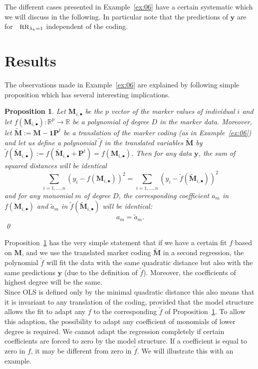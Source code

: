 \documentclass{bmcart}
\newtheorem{proposition}{Proposition}
\newcommand{\M}{\mathbf{M}}
\newcommand{\0}{\mathbf{0}}
\newcommand{\y}{\mathbf{y}}
\renewcommand{\P}{\mathbf{P}}
\begin{document}
The different cases presented in Example~\ref{ex:06} have a certain systematic which we will discuss in the following. 
In particular note that the predictions of $\y$ are for $\mbox{\small RR}_{\lambda_h = 1}$ independent of the coding.


\section*{Results} 
The observations made in Example~\ref{ex:06} are explained by following simple proposition
which has several interesting implications.
\begin{proposition}\label{prop:01} Let $\M_{i,\bullet}$ be the $p$ vector of the marker values of individual $i$ and let $f(\M_{i,\bullet}): \mathbb{R}^p \rightarrow \mathbb{R}$ be a polynomial of degree $D$ in the marker data. Moreover, let $\tilde{\M}:= \M - \mathbf{1} \P^t$ be a translation of the marker coding (as in Example~\ref{ex:06}) and let us define a polynomial $\tilde{f}$ in the translated variables $\tilde{\M}$ by $\tilde{f}(\tilde{\M}_{i,\bullet}):= f(\tilde{\M}_{i,\bullet} +  \P^t)=f(\M_{i,\bullet})$. Then for any data $\y$, the sum of squared distances will be identical 
	$$ \sum_{i=1,...,n} (y_i - f(\M_{i,\bullet}))^2 = \sum_{i=1,...,n} (y_i - \tilde{f}(\tilde{\M}_{i,\bullet}))^2 $$
	and for any monomial $m$ of degree $D$, the corresponding coefficient $a_m$ in $f(\M_{i,\bullet})$ and $\tilde{a}_m$ in $\tilde{f}(\tilde{\M}_{i,\bullet})$ will be identical:
	$$a_m = \tilde{a}_m.$$ \qed
\end{proposition}
Proposition~\ref{prop:01} has the very simple statement that if we have a certain fit $f$ based on $\M$, and we use the translated marker coding $\tilde{\M}$ in a second regression, the polynomial $\tilde{f}$ will fit the data with the same quadratic distance but also with the same predictions $\hat{\y}$ (due to the definition of $\tilde{f}$). Moreover, the coefficients of highest degree will be the same.  \\

Since OLS is defined only by the minimal quadratic distance this also means that it is invariant to any translation of the coding, provided that the model structure allows the fit to 
adapt any $f$ to the corresponding $\tilde{f}$ of Proposition~\ref{prop:01}.
To allow this adaption, the possibility to adapt any coefficient of monomials of lower degree is required.
We cannot adapt the regression completely if certain coefficients are forced to zero by the model structure. If a coefficient is equal to zero in $f$, it may be different from zero in $\tilde{f}$.
We will illustrate this with an example. 
\end{document}

